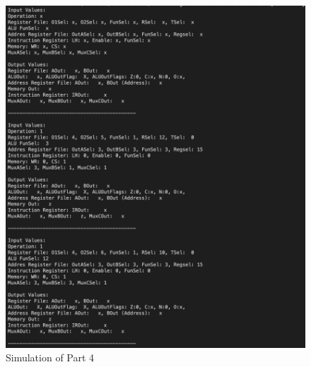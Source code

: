 \documentclass[pdftex,12pt,a4paper]{article}
\begin{document}
\begin{figure}[H]
\centering
\includegraphics[width=1\textwidth]{part4_sim.png}
\caption{Simulation of Part 4}
\label{fig:part4_sim}
\end{figure}
\end{document}
